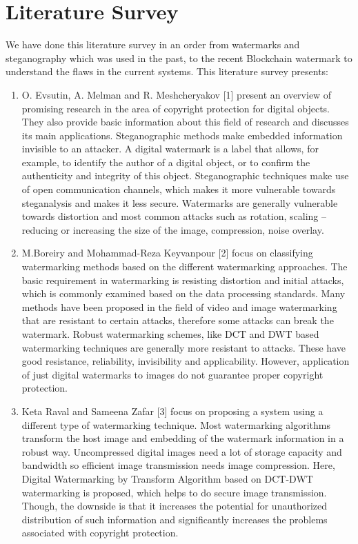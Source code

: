 \documentclass[10pt]{article}
\begin{document}
\section{Literature Survey }
We have done this literature survey in an order from watermarks and steganography which was used in the past, to the recent Blockchain watermark to understand the flaws in the current systems. This literature survey presents:
\begin{enumerate}
 \item O. Evsutin, A. Melman and R. Meshcheryakov [1] present an overview of promising research in the area of copyright protection for digital objects. They also provide basic information about this field of research and discusses its main applications. Steganographic methods make embedded information invisible to an attacker. A digital watermark is a label that allows, for example, to identify the author of a digital object, or to confirm the authenticity and integrity of this object. Steganographic techniques make use of open communication channels, which makes it more vulnerable towards steganalysis and makes it less secure. Watermarks are generally vulnerable towards distortion and most common attacks such as rotation, scaling – reducing or increasing the size of the image, compression, noise overlay. 
\\
\item M.Boreiry and Mohammad-Reza  Keyvanpour [2] focus on classifying watermarking methods based on the different watermarking approaches. The basic requirement in watermarking is resisting distortion and initial attacks, which is commonly examined based on the data processing standards. Many methods have been proposed in the field of video and image watermarking that are resistant to certain attacks, therefore some attacks can break the watermark. Robust watermarking schemes, like DCT and DWT based watermarking techniques are generally more resistant to attacks.  These have good resistance, reliability, invisibility and applicability. However, application of just digital watermarks to images do not guarantee proper copyright protection.
\\
\item Keta  Raval  and  Sameena  Zafar [3]
   focus on proposing a system using a different type of watermarking technique. Most watermarking algorithms transform the host image and embedding of the watermark information in a robust way. Uncompressed digital images need a lot of storage capacity and bandwidth so efficient image transmission needs image compression. Here, Digital Watermarking by Transform Algorithm based on DCT-DWT watermarking is proposed, which helps to do secure image transmission. Though, the downside is that it increases the potential for unauthorized distribution of such information and significantly increases the problems associated with copyright protection.

\end{enumerate}
\end{document}
